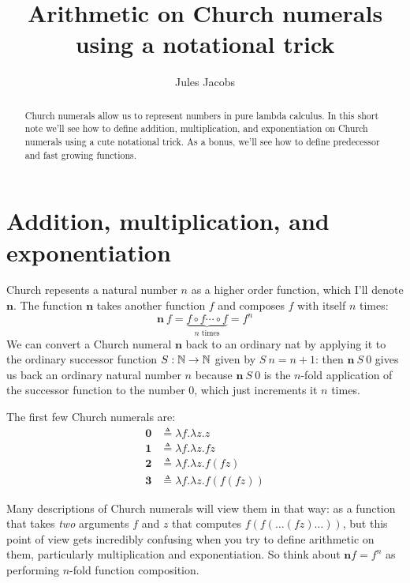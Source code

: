 

\title{Arithmetic on Church numerals using a notational trick}
\author{Jules Jacobs}

\maketitle

\begin{abstract}
  Church numerals allow us to represent numbers in pure lambda calculus. In this short note we'll see how to define addition, multiplication, and exponentiation on Church numerals using a cute notational trick. As a bonus, we'll see how to define predecessor and fast growing functions.
\end{abstract}

\newcommand{\ch}[1]{\mathbf{#1}}

\section{Addition, multiplication, and exponentiation}

Church repesents a natural number $n$ as a higher order function, which I'll denote $\ch{n}$.
The function $\ch{n}$ takes another function $f$ and composes $f$ with itself $n$ times:
\[
  \ch{n}\ f = \underbrace{f \circ f \cdots \circ f}_{n\text{ times}} = f^n
\]
We can convert a Church numeral $\ch{n}$ back to an ordinary nat by applying it to the ordinary successor function $S : \mathbb{N} \to \mathbb{N}$ given by $S\ n = n+1$:
then $\ch{n}\ S\ 0$ gives us back an ordinary natural number $n$ because $\ch{n}\ S\ 0$ is the $n$-fold application of the successor function to the number $0$, which just increments it $n$ times.

The first few Church numerals are:
\begin{align*}
  \ch{0} &\triangleq{} \lambda f.\lambda z. z\\
  \ch{1} &\triangleq{} \lambda f.\lambda z. f z\\
  \ch{2} &\triangleq{} \lambda f.\lambda z.f (f z)\\
  \ch{3} &\triangleq{} \lambda f.\lambda z.f (f (f z))
\end{align*}

Many descriptions of Church numerals will view them in that way: as a function that takes \emph{two} arguments $f$ and $z$ that computes $f (f (\dots (f z) \dots))$, but this point of view gets incredibly confusing when you try to define arithmetic on them, particularly multiplication and exponentiation.
So think about $\ch{n} f = f^n$ as performing $n$-fold function composition.

